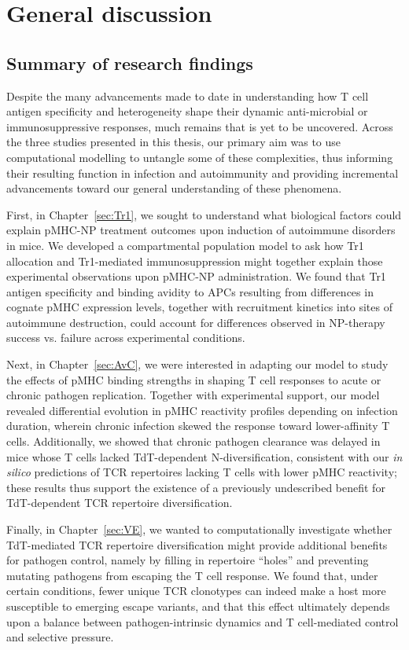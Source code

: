 \chapter{General discussion}
\label{sec:conclusion}

\section{Summary of research findings}

Despite the many advancements made to date in understanding how T cell antigen specificity and heterogeneity shape their dynamic anti-microbial or immunosuppressive responses, much remains that is yet to be uncovered. Across the three studies presented in this thesis, our primary aim was to use computational modelling to untangle some of these complexities, thus informing their resulting function in infection and autoimmunity and providing incremental advancements toward our general understanding of these phenomena.

First, in Chapter~\ref{sec:Tr1}, we sought to understand what biological factors could explain pMHC-NP treatment outcomes upon induction of autoimmune disorders in mice. We developed a compartmental population model to ask how Tr1 allocation and Tr1-mediated immunosuppression might together explain those experimental observations upon pMHC-NP administration. We found that Tr1 antigen specificity and binding avidity to APCs resulting from differences in cognate pMHC expression levels, together with recruitment kinetics into sites of autoimmune destruction, could account for differences observed in NP-therapy success vs. failure across experimental conditions.

Next, in Chapter~\ref{sec:AvC}, we were interested in adapting our model to study the effects of pMHC binding strengths in shaping T cell responses to acute or chronic pathogen replication. Together with experimental support, our model revealed differential evolution in pMHC reactivity profiles depending on infection duration, wherein chronic infection skewed the response toward lower-affinity T cells. Additionally, we showed that chronic pathogen clearance was delayed in mice whose T cells lacked TdT-dependent N-diversification, consistent with our \textit{in silico} predictions of TCR repertoires lacking T cells with lower pMHC reactivity; these results thus support the existence of a previously undescribed benefit for TdT-dependent TCR repertoire diversification.

Finally, in Chapter~\ref{sec:VE}, we wanted to computationally investigate whether TdT-mediated TCR repertoire diversification might provide additional benefits for pathogen control, namely by filling in repertoire ``holes'' and preventing mutating pathogens from escaping the T cell response. We found that, under certain conditions, fewer unique TCR clonotypes can indeed make a host more susceptible to emerging escape variants, and that this effect ultimately depends upon a balance between pathogen-intrinsic dynamics and T cell-mediated control and selective pressure.

